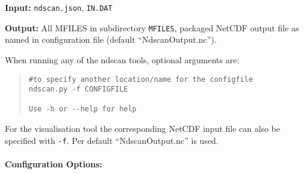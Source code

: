 \documentclass[11pt,a4paper]{article}
\newcommand{\indat}{\mbox{\texttt{IN.DAT}}}
\begin{document}
\begin{description}
\item{\textbf{Input:}}
 \texttt{ndscan.json}, \indat

\item{\textbf{Output:}} All MFILES in subdirectory \texttt{MFILES}, packaged NetCDF output file as named in configuration file (default ``NdscanOutput.nc'').
\end{description}

When running any of the ndscan tools, optional arguments are:
\begin{quote}
\begin{verbatim}
#to specify another location/name for the configfile
ndscan.py -f CONFIGFILE

Use -h or --help for help
\end{verbatim}
\end{quote}
For the visualisation tool the corresponding NetCDF input file can also be specified with \texttt{-f}. Per default ``NdscanOutput.nc'' is used.

\paragraph{Configuration Options:}
\end{document}

